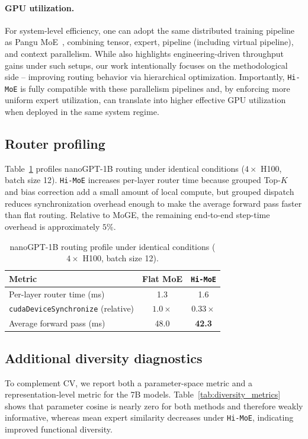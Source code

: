 \documentclass[sigconf,nonacm]{acmart}
\begin{document}
\paragraph{GPU utilization.}
For system-level efficiency, one can adopt the same distributed training pipeline as Pangu MoE~\citep{moge}, combining tensor, expert, pipeline (including virtual pipeline), and context parallelism. While \citep{moge} also highlights engineering-driven throughput gains under such setups, our work intentionally focuses on the methodological side -- improving routing behavior via hierarchical optimization. Importantly, \texttt{Hi-MoE} is fully compatible with these parallelism pipelines and, by enforcing more uniform expert utilization, can translate into higher effective GPU utilization when deployed in the same system regime.

\subsection{Router profiling}
\label{app:repro:profiling}
Table~\ref{tab:router_profile} profiles nanoGPT-1B routing under identical conditions ($4\times$ H100, batch size 12). \texttt{Hi-MoE} increases per-layer router time because grouped Top-$K$ and bias correction add a small amount of local compute, but grouped dispatch reduces synchronization overhead enough to make the average forward pass faster than flat routing. Relative to MoGE, the remaining end-to-end step-time overhead is approximately $5\%$.

\begin{table}[!htbp]
\centering
\caption{nanoGPT-1B routing profile under identical conditions ($4\times$ H100, batch size 12).}
\label{tab:router_profile}
\setlength{\tabcolsep}{7pt}
\begin{tabular}{lcc}
\toprule
\textbf{Metric} & \textbf{Flat MoE} & \textbf{\texttt{Hi-MoE}} \\
\midrule
Per-layer router time (ms) & 1.3 & 1.6 \\
\texttt{cudaDeviceSynchronize} (relative) & $1.0\times$ & $0.33\times$ \\
Average forward pass (ms) & 48.0 & \textbf{42.3} \\
\bottomrule
\end{tabular}
\vspace{-4mm}
\end{table}

\subsection{Additional diversity diagnostics}
\label{app:repro:diversity}
To complement CV, we report both a parameter-space metric and a representation-level metric for the 7B models. Table~\ref{tab:diversity_metrics} shows that parameter cosine is nearly zero for both methods and therefore weakly informative, whereas mean expert similarity decreases under \texttt{Hi-MoE}, indicating improved functional diversity.
\end{document}
